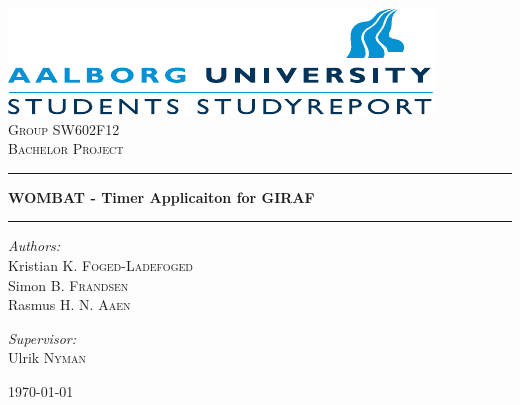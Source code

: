 \begin{titlepage}

\begin{center}

\includegraphics[width=\textwidth]{Images/aau_logo_en.pdf}\\[1cm]    

\textsc{\LARGE Group SW602F12}\\[1.5cm]

\textsc{\Large Bachelor Project}\\[0.5cm]


\hrule
\vspace{0.4cm}

{ \huge \bfseries WOMBAT - Timer Applicaiton for GIRAF}\\[0.4cm]

\hrule
\vspace{1.5cm}

\begin{minipage}{0.55\textwidth}
\begin{flushleft} \large
\vspace{1.25cm}
\textit{Authors:}\\
Kristian K. \textsc{Foged-Ladefoged}\\

Simon B. \textsc{Frandsen}\\

Rasmus H. N. \textsc{Aaen}
\end{flushleft}
\end{minipage}
\begin{minipage}{0.35\textwidth}
\begin{flushright} \large
\textit{Supervisor:} \\
Ulrik \textsc{Nyman}
\end{flushright}
\end{minipage}

\vfill

{\large \today}

\end{center}

\end{titlepage}
